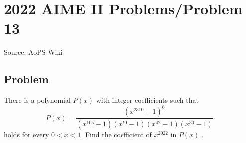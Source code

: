 \documentclass[12pt]{article}
\begin{document}
\section*{{2022 AIME II Problems/Problem 13}}
Source: AoPS Wiki

\subsection*{Problem}
There is a polynomial $P(x)$ with integer coefficients such that \[P(x)=\frac{(x^{2310}-1)^6}{(x^{105}-1)(x^{70}-1)(x^{42}-1)(x^{30}-1)}\] holds for every $0<x<1.$ Find the coefficient of $x^{2022}$ in $P(x)$ .
\end{document}
